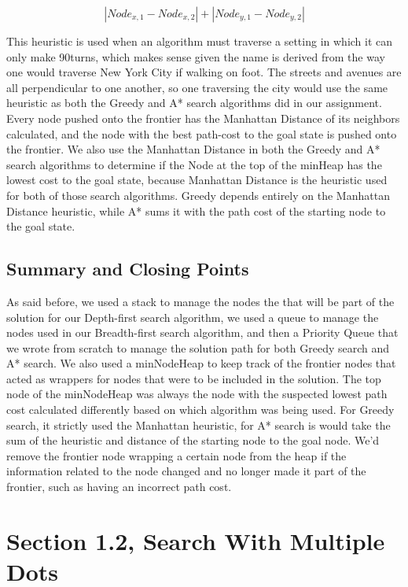 \documentclass[titlepage]{article}
\begin{document}
\[ |Node_{x, 1} - Node_{x, 2}| + |Node_{y, 1} - Node_{y, 2}|   \]

\noindent
This heuristic is used when an algorithm must traverse a setting in which it can only make 90\degree turns, which makes sense given the name is derived from the way one would traverse New York City if walking on foot. The streets and avenues are all perpendicular to one another, so one traversing the city would use the same heuristic as both the Greedy and A* search algorithms did in our assignment. Every node pushed onto the frontier has the Manhattan Distance of its neighbors calculated, and the node with the best path-cost to the goal state is pushed onto the frontier. We also use the Manhattan Distance in both the Greedy and A* search algorithms to determine if the Node at the top of the minHeap has the lowest cost to the goal state, because Manhattan Distance is the heuristic used for both of those search algorithms. Greedy depends entirely on the Manhattan Distance heuristic, while A* sums it with the path cost of the starting node to the goal state.

\subsection{Summary and Closing Points}
As said before, we used a stack to manage the nodes the that will be part of the solution for our Depth-first search algorithm, we used a queue to manage the nodes used in our Breadth-first search algorithm, and then a Priority Queue that we wrote from scratch to manage the solution path for both Greedy search and A* search. We also used a minNodeHeap to keep track of the frontier nodes that acted as wrappers for nodes that were to be included in the solution. The top node of the minNodeHeap was always the node with the suspected lowest path cost calculated differently based on which algorithm was being used. For Greedy search, it strictly used the Manhattan heuristic, for A* search is would take the sum of the heuristic and distance of the starting node to the goal node. We'd remove the frontier node wrapping a certain node from the heap if the information related to the node changed and no longer made it part of the frontier, such as having an incorrect path cost. 

\newpage

\section{Section 1.2, Search With Multiple Dots} 
\end{document}
